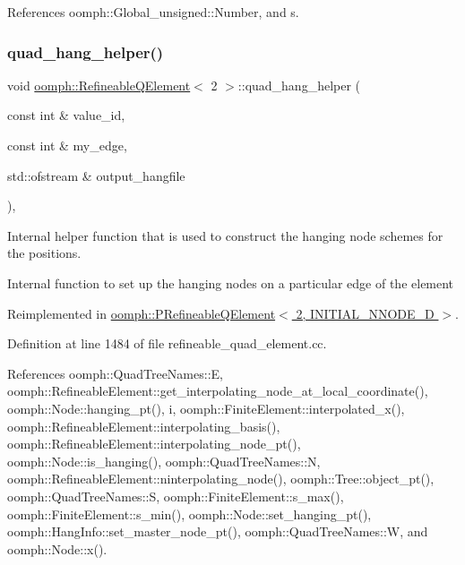 References oomph\+::\+Global\+\_\+unsigned\+::\+Number, and s.

\mbox{\label{classoomph_1_1RefineableQElement_3_012_01_4_a711171287234070046a02bbf56ed2664}} 
\subsubsection{\texorpdfstring{quad\+\_\+hang\+\_\+helper()}{quad\_hang\_helper()}}
{\footnotesize\ttfamily void \hyperlink{classoomph_1_1RefineableQElement}{oomph\+::\+Refineable\+Q\+Element}$<$ 2 $>$\+::quad\+\_\+hang\+\_\+helper (\begin{DoxyParamCaption}\item[{const int \&}]{value\+\_\+id,  }\item[{const int \&}]{my\+\_\+edge,  }\item[{std\+::ofstream \&}]{output\+\_\+hangfile }\end{DoxyParamCaption})\hspace{0.3cm}{\ttfamily [protected]}, {\ttfamily [virtual]}}



Internal helper function that is used to construct the hanging node schemes for the positions. 

Internal function to set up the hanging nodes on a particular edge of the element 

Reimplemented in \hyperlink{classoomph_1_1PRefineableQElement_3_012_00_01INITIAL__NNODE__1D_01_4_abf33572d0ba9cd9bf06ca137256c422d}{oomph\+::\+P\+Refineable\+Q\+Element$<$ 2, I\+N\+I\+T\+I\+A\+L\+\_\+\+N\+N\+O\+D\+E\+\_\+D $>$}.



Definition at line 1484 of file refineable\+\_\+quad\+\_\+element.\+cc.



References oomph\+::\+Quad\+Tree\+Names\+::E, oomph\+::\+Refineable\+Element\+::get\+\_\+interpolating\+\_\+node\+\_\+at\+\_\+local\+\_\+coordinate(), oomph\+::\+Node\+::hanging\+\_\+pt(), i, oomph\+::\+Finite\+Element\+::interpolated\+\_\+x(), oomph\+::\+Refineable\+Element\+::interpolating\+\_\+basis(), oomph\+::\+Refineable\+Element\+::interpolating\+\_\+node\+\_\+pt(), oomph\+::\+Node\+::is\+\_\+hanging(), oomph\+::\+Quad\+Tree\+Names\+::N, oomph\+::\+Refineable\+Element\+::ninterpolating\+\_\+node(), oomph\+::\+Tree\+::object\+\_\+pt(), oomph\+::\+Quad\+Tree\+Names\+::S, oomph\+::\+Finite\+Element\+::s\+\_\+max(), oomph\+::\+Finite\+Element\+::s\+\_\+min(), oomph\+::\+Node\+::set\+\_\+hanging\+\_\+pt(), oomph\+::\+Hang\+Info\+::set\+\_\+master\+\_\+node\+\_\+pt(), oomph\+::\+Quad\+Tree\+Names\+::W, and oomph\+::\+Node\+::x().

